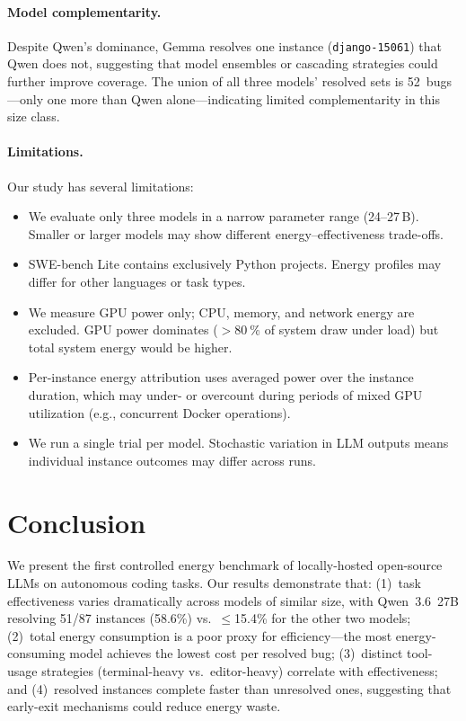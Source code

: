 \documentclass[10pt,twocolumn]{article}
\begin{document}
\paragraph{Model complementarity.}
Despite Qwen's dominance, Gemma resolves one instance
(\texttt{django-15061}) that Qwen does not, suggesting that model
ensembles or cascading strategies could further improve coverage.
The union of all three models' resolved sets is 52~bugs---only one
more than Qwen alone---indicating limited complementarity in this
size class.

\paragraph{Limitations.}
Our study has several limitations:
\begin{itemize}[nosep, leftmargin=*]
  \item We evaluate only three models in a narrow parameter range
        (24--27\,B). Smaller or larger models may show different
        energy--effectiveness trade-offs.
  \item SWE-bench Lite contains exclusively Python projects. Energy
        profiles may differ for other languages or task types.
  \item We measure GPU power only; CPU, memory, and network energy
        are excluded. GPU power dominates
        ($>\SI{80}{\percent}$ of system draw under load) but total
        system energy would be higher.
  \item Per-instance energy attribution uses averaged power over the
        instance duration, which may under- or overcount during
        periods of mixed GPU utilization (e.g., concurrent Docker
        operations).
  \item We run a single trial per model. Stochastic variation in
        LLM outputs means individual instance outcomes may differ
        across runs.
\end{itemize}


\section{Conclusion}
\label{sec:conclusion}

We present the first controlled energy benchmark of locally-hosted
open-source LLMs on autonomous coding tasks.
Our results demonstrate that:
(1)~task effectiveness varies dramatically across models of similar
    size, with Qwen~3.6~27B resolving 51/87 instances (58.6\%)
    vs.\ $\leq$15.4\% for the other two models;
(2)~total energy consumption is a poor proxy for efficiency---the
    most energy-consuming model achieves the lowest cost per resolved
    bug;
(3)~distinct tool-usage strategies (terminal-heavy vs.\
    editor-heavy) correlate with effectiveness; and
(4)~resolved instances complete faster than unresolved ones,
    suggesting that early-exit mechanisms could reduce energy waste.
\end{document}
